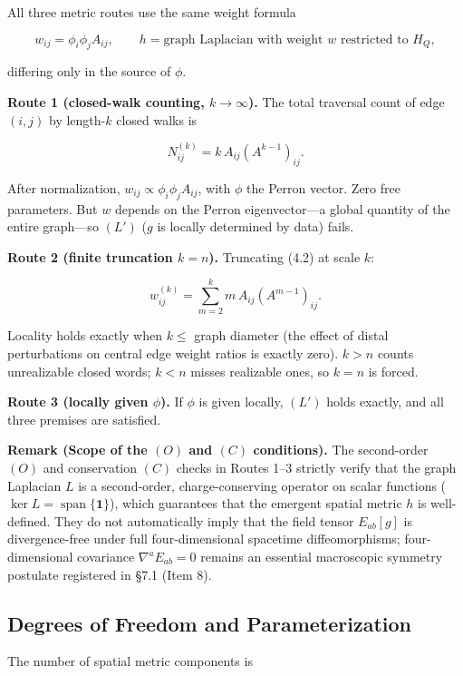\documentclass[
  11pt,
]{article}
\begin{document}
All three metric routes use the same weight formula

\[
w_{ij}=\phi_i\phi_jA_{ij},
\qquad h=\text{graph Laplacian with weight }w\text{ restricted to }H_Q,
\tag{4.1}
\]

differing only in the source of \(\phi\).

\textbf{Route 1 (closed-walk counting, \(k\to\infty\)).} The total
traversal count of edge \((i,j)\) by length-\(k\) closed walks is

\[
N^{(k)}_{ij}=k\,A_{ij}(A^{k-1})_{ij}.
\tag{4.2}
\]

After normalization, \(w_{ij}\propto\phi_i\phi_jA_{ij}\), with \(\phi\)
the Perron vector. Zero free parameters. But \(w\) depends on the Perron
eigenvector---a global quantity of the entire graph---so \((L')\) (\(g\)
is locally determined by data) fails.

\textbf{Route 2 (finite truncation \(k=n\)).} Truncating (4.2) at scale
\(k\):

\[
w^{(k)}_{ij}=\sum_{m=2}^{k} m\,A_{ij}(A^{m-1})_{ij}.
\tag{4.3}
\]

Locality holds exactly when \(k\le\) graph diameter (the effect of
distal perturbations on central edge weight ratios is exactly zero).
\(k>n\) counts unrealizable closed words; \(k<n\) misses realizable
ones, so \(k=n\) is forced.

\textbf{Route 3 (locally given \(\phi\)).} If \(\phi\) is given locally,
\((L')\) holds exactly, and all three premises are satisfied.

\textbf{Remark (Scope of the \((O)\) and \((C)\) conditions).} The
second-order \((O)\) and conservation \((C)\) checks in Routes 1--3
strictly verify that the graph Laplacian \(L\) is a second-order,
charge-conserving operator on scalar functions
(\(\ker L = \operatorname{span}\{\mathbf{1}\}\)), which guarantees that
the emergent spatial metric \(h\) is well-defined. They do not
automatically imply that the field tensor \(E_{ab}[g]\) is
divergence-free under full four-dimensional spacetime diffeomorphisms;
four-dimensional covariance \(\nabla^a E_{ab}=0\) remains an essential
macroscopic symmetry postulate registered in §7.1 (Item 8).

\subsection{Degrees of Freedom and
Parameterization}\label{degrees-of-freedom-and-parameterization}

The number of spatial metric components is
\end{document}
